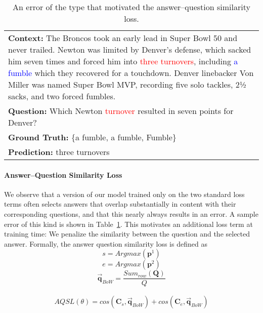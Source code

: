 \documentclass[11pt,letterpaper]{article}
\begin{document}
\begin{table}
\centering
\begin{tabular}{p{}}
\toprule
\textbf{Context:}
The Broncos took an early lead in Super Bowl 50 and never
trailed. Newton was limited by Denver's defense, which
sacked him seven times and forced him into \textcolor{red}{three turnovers}, 
including \textcolor{blue}{a fumble} which they recovered for a touchdown. 
Denver linebacker Von Miller was named Super Bowl MVP, 
recording five solo tackles, 2½ sacks, and two forced 
fumbles. 
\\
\vspace{-0.1em}
\textbf{Question:}
Which Newton \textcolor{red}{turnover} resulted in seven points for Denver?\\
\vspace{-0.1em}
\textbf{Ground Truth:} \{a fumble,
a fumble,
Fumble\}\\
\vspace{-0.1em}
\textbf{Prediction:}
three turnovers\\
\bottomrule
\end{tabular}

\caption{An error of the type that motivated the answer--question similarity loss.}\label{tab:AQS_sample}
\end{table}

\paragraph{Answer--Question Similarity Loss} We observe that a version of our model trained only on the two standard loss terms often selects answers that overlap substantially in content with their corresponding questions, and that this nearly always results in an error. A sample error of this kind is shown in Table~\ref{tab:AQS_sample}. This motivates an additional loss term at training time: We penalize the similarity between the question and the selected answer. Formally, the answer question similarity loss is defined as
\begin{equation}
s = Argmax(\bm{p}^1)
\end{equation}
\begin{equation}
e = Argmax(\bm{p}^2)
\end{equation}
\begin{equation}
\bm{\vec{q}}_{BoW} = \frac{Sum_{row}(\bm{Q})}{Q}
\end{equation}

\begin{equation}
\begin{split} 
AQSL(\theta) = cos(\bm{C}_{s}, \bm{\vec{q}}_{BoW})+  cos(\bm{C}_{e}, \bm{\vec{q}}_{BoW})
\end{split}
\end{equation} 
\end{document}
